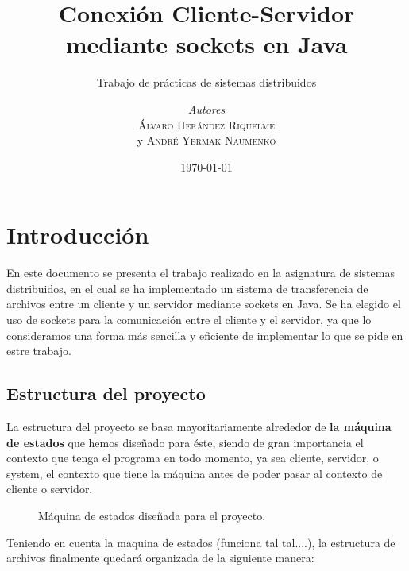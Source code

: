 \documentclass[a4paper, 12pt]{report}
\institute{Universidad Politécnica de Cartagena}
\title{Conexión Cliente-Servidor mediante sockets en Java}
\subtitle{Trabajo de prácticas de sistemas distribuidos }
\author{\textit{Autores}\\\textsc{Álvaro Herández Riquelme}\\ y \textsc{André Yermak Naumenko}}
\date{\today}
\begin{document}
    \maketitle
    \romantableofcontents

\newpage

    \chapter{Introducción}

    En este documento se presenta el trabajo realizado en la asignatura de sistemas distribuidos, en el cual se ha
    implementado un sistema de transferencia de archivos entre un cliente y un servidor mediante sockets en Java.
    Se ha elegido el uso de sockets para la comunicación entre el cliente y el servidor, ya que lo consideramos una
    forma más sencilla y eficiente de implementar lo que se pide en estre trabajo.

    \section{Estructura del proyecto}

    La estructura del proyecto se basa mayoritariamente alrededor de \textbf{la máquina de estados} que hemos
    diseñado para éste, siendo de gran importancia el contexto que tenga el programa en todo momento, ya sea
    cliente, servidor, o system, el contexto que tiene la máquina antes de poder pasar al contexto de cliente o
    servidor.

    \begin{figure}[htb]
        \centering
        \caption{Máquina de estados diseñada para el proyecto.}
        \label{fig:diagrama}
    \end{figure}

    Teniendo en cuenta la maquina de estados (funciona tal tal....), la estructura de archivos finalmente quedará
    organizada de la siguiente manera:
\end{document}
